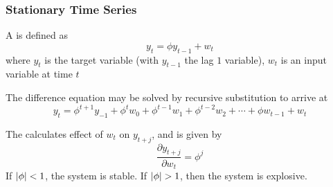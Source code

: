 \subsubsection{Stationary Time Series}

\begin{definition}
A  is defined as
\begin{equation}
y_t = \phi y_{t-1} + w_t \nonumber
\end{equation}
where $y_t$ is the target variable (with $y_{t-1}$ the lag $1$ variable), $w_t$ is an input variable at time $t$
\end{definition}

The difference equation may be solved by recursive substitution to arrive at
\begin{equation}
y_t = \phi^{t+1}y_{-1} + \phi^{t} w_0 + \phi^{t-1} w_1 + \phi^{t-2} w_2 + \cdots + \phi w_{t-1} + w_t \nonumber
\end{equation}

The  calculates effect of $w_t$ on $y_{t+j}$, and is given by
\begin{equation}
\frac{\partial y_{t+j}}{\partial w_t} = \phi^j \nonumber
\end{equation}
If $\left\lvert\phi\right\rvert < 1$, the system is stable. If $\left\lvert\phi\right\rvert > 1$, then the system is explosive.

